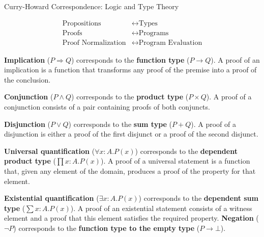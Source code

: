\begin{table}[htbp]
\centering
\caption{Curry-Howard Correspondence: Logic and Type Theory}


\begin{align}
\text{Propositions} &\leftrightarrow \text{Types} \\
\text{Proofs} &\leftrightarrow \text{Programs} \\
\text{Proof Normalization} &\leftrightarrow \text{Program Evaluation}
\end{align}

\textbf{Implication} ($P \Rightarrow Q$) corresponds to the \textbf{function type} ($P \to Q$). 
A proof of an implication is a function that transforms any proof of the premise into a proof of the conclusion.

\textbf{Conjunction} ($P \land Q$) corresponds to the \textbf{product type} ($P \times Q$). 
A proof of a conjunction consists of a pair containing proofs of both conjuncts.

\textbf{Disjunction} ($P \lor Q$) corresponds to the \textbf{sum type} ($P + Q$). 
A proof of a disjunction is either a proof of the first disjunct or a proof of the second disjunct.

\textbf{Universal quantification} ($\forall x:A.P(x)$) corresponds to the \textbf{dependent product type} 
($\prod x:A.P(x)$). 
A proof of a universal statement is a function that, given any element of the domain, 
produces a proof of the property for that element.

\textbf{Existential quantification} ($\exists x:A.P(x)$) corresponds to the \textbf{dependent sum type} 
($\sum x:A.P(x)$). A proof of an existential statement consists of a witness element and a proof 
that this element satisfies the required property.
\textbf{Negation} ($\neg P$) corresponds to the \textbf{function type to the empty type} ($P \to \bot$).


\end{table}
